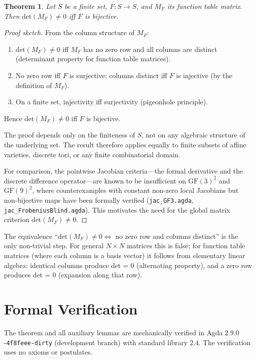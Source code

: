 \documentclass[a4paper,11pt]{article}
\newtheorem{theorem}{Theorem}[section]
\theoremstyle{definition}
\theoremstyle{remark}
\newcommand{\GF}{\mathrm{GF}}
\newcommand{\MF}{M_F}
\newcommand{\Det}{\mathrm{det}}
\begin{document}
\begin{theorem}\label{thm:main}
Let $S$ be a finite set, $F:S\to S$, and $\MF$ its function table matrix.
Then $\Det(\MF)\neq 0$ iff $F$ is bijective.
\end{theorem}

\begin{proof}[Proof sketch]
From the column structure of $\MF$:
\begin{enumerate}
\item $\Det(\MF)\neq 0$ iff $\MF$ has no zero row and all columns are
distinct (determinant property for function table matrices).
\item No zero row iff $F$ is surjective; columns distinct iff $F$ is injective
(by the definition of $\MF$).
\item On a finite set, injectivity iff surjectivity (pigeonhole principle).
\end{enumerate}
Hence $\Det(\MF)\neq 0$ iff $F$ is bijective.

The proof depends only on the finiteness of $S$, not on any algebraic
structure of the underlying set. The result therefore applies equally to
finite subsets of affine varieties, discrete tori, or any finite
combinatorial domain.

For comparison, the pointwise Jacobian criteria---the formal derivative
and the discrete difference operator---are known to be insufficient on
$\GF(3)^2$ and $\GF(9)^2$, where counterexamples with constant non-zero
local Jacobians but non-bijective maps have been formally verified
(\texttt{jac\_GF3.agda}, \texttt{jac\_FrobeniusBlind.agda}). This
motivates the need for the global matrix criterion $\Det(\MF)\neq 0$.
\end{proof}

The equivalence ``$\Det(\MF)\neq 0 \iff$ no zero row and columns distinct''
is the only non-trivial step. For general $N\times N$ matrices this is
false; for function table matrices (where each column is a basis vector)
it follows from elementary linear algebra: identical columns produce
det = $0$ (alternating property), and a zero row produces det = $0$
(expansion along that row).

\section{Formal Verification}

The theorem and all auxiliary lemmas are mechanically verified in
Agda $2.9.0$-\texttt{4f8feee-dirty} (development branch) with
standard library $2.4$. The verification uses no axioms or postulates.
\end{document}
